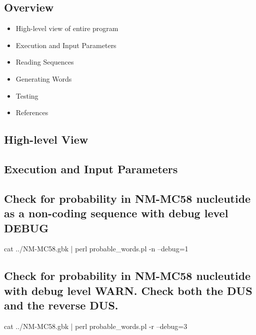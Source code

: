 \documentclass[12pt,notitlepage]{article}
\author{Leo Przybylski}
\begin{document}
  \W \begin{s5presentation}
  \maketitle

\begin{ifhtml}
    \begin{s5slide}
      \section{Overview}
      \begin{itemize}
      \item High-level view of entire program
      \item Execution and Input Parameters
      \item Reading Sequences
      \item Generating Words
      \item Testing
      \item References
      \end{itemize}
    \end{s5slide}

    \begin{s5slide}
      \section{High-level View}
    \end{s5slide}

    \begin{s5slide}
      \section{Execution and Input Parameters}
      \subsection{Check for probability in NM-MC58 nucleutide as a non-coding sequence with debug level DEBUG}
      cat ../NM-MC58.gbk | perl probable_words.pl -n --debug=1
      \subsection{Check for probability in NM-MC58 nucleutide with debug level WARN. Check both the DUS and the reverse DUS.}
      cat ../NM-MC58.gbk | perl probable_words.pl -r --debug=3

\end{s5slide}
\end{ifhtml}
\end{s5presentation}
\end{document}
